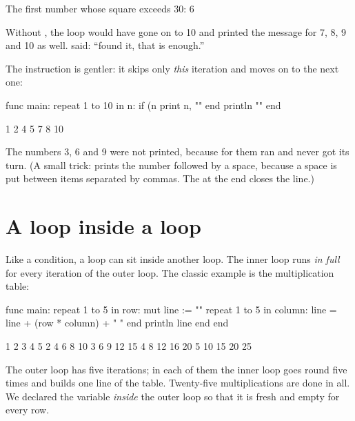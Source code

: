 \begin{salamout}
The first number whose square exceeds 30: 6
\end{salamout}

Without , the loop would have gone on to 10 and printed the
message for 7, 8, 9 and 10 as well.  said: ``found it, that is
enough.''

The instruction  is gentler: it skips only \emph{this}
iteration and moves on to the next one:

\begin{salamcode}
func main:
    repeat 1 to 10 in n:
        if (n %
        print n, ""
    end
    println ""
end
\end{salamcode}

\begin{salamout}
1 2 4 5 7 8 10
\end{salamout}

The numbers 3, 6 and 9 were not printed, because for them 
ran and  never got its turn. (A small trick: 
prints the number followed by a space, because a space is put between items
separated by commas. The  at the end closes the line.)

\section{A loop inside a loop}

Like a condition, a loop can sit inside another loop. The inner loop runs
\emph{in full} for every iteration of the outer loop. The classic example is
the multiplication table:

\begin{salamcode}
func main:
    repeat 1 to 5 in row:
        mut line := ""
        repeat 1 to 5 in column:
            line = line + (row * column) + " "
        end
        println line
    end
end
\end{salamcode}

\begin{salamout}
1 2 3 4 5
2 4 6 8 10
3 6 9 12 15
4 8 12 16 20
5 10 15 20 25
\end{salamout}

The outer loop has five iterations; in each of them the inner loop goes
round five times and builds one line of the table. Twenty-five
multiplications are done in all. We declared the variable 
\emph{inside} the outer loop so that it is fresh and empty for every row.

